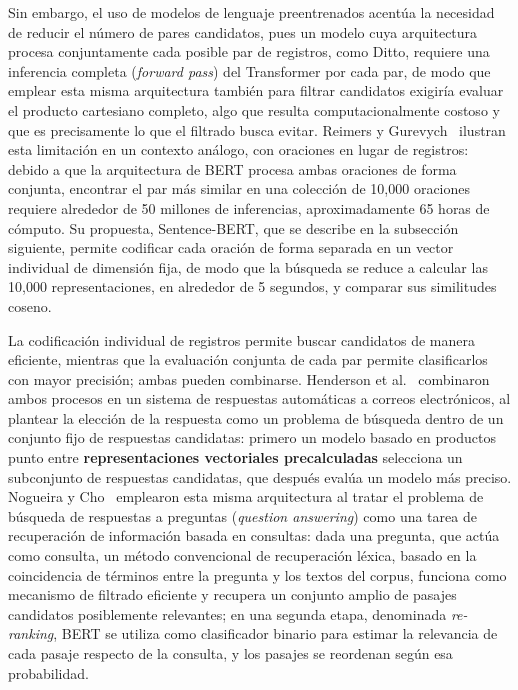 Sin embargo, el uso de modelos de lenguaje preentrenados acentúa la necesidad de reducir el número de pares candidatos, pues un modelo cuya arquitectura procesa conjuntamente cada posible par de registros, como Ditto, requiere una inferencia completa (\textit{forward pass}) del Transformer por cada par, de modo que emplear esta misma arquitectura también para filtrar candidatos exigiría evaluar el producto cartesiano completo, algo que resulta computacionalmente costoso y que es precisamente lo que el filtrado busca evitar. Reimers y Gurevych~\cite{reimers2019} ilustran esta limitación en un contexto análogo, con oraciones en lugar de registros: debido a que la arquitectura de BERT procesa ambas oraciones de forma conjunta, encontrar el par más similar en una colección de 10,000 oraciones requiere alrededor de 50 millones de inferencias, aproximadamente 65 horas de cómputo. Su propuesta, Sentence-BERT, que se describe en la subsección siguiente, permite codificar cada oración de forma separada en un vector individual de dimensión fija, de modo que la búsqueda se reduce a calcular las 10,000 representaciones, en alrededor de 5 segundos, y comparar sus similitudes coseno.

La codificación individual de registros permite buscar candidatos de manera eficiente, mientras que la evaluación conjunta de cada par permite clasificarlos con mayor precisión; ambas pueden combinarse. Henderson et al.~\cite{henderson2017} combinaron ambos procesos en un sistema de respuestas automáticas a correos electrónicos, al plantear la elección de la respuesta como un problema de búsqueda dentro de un conjunto fijo de respuestas candidatas: primero un modelo basado en productos punto entre \textbf{representaciones vectoriales precalculadas} selecciona un subconjunto de respuestas candidatas, que después evalúa un modelo más preciso. Nogueira y Cho~\cite{nogueira2019} emplearon esta misma arquitectura al tratar el problema de búsqueda de respuestas a preguntas (\textit{question answering}) como una tarea de recuperación de información basada en consultas: dada una pregunta, que actúa como consulta, un método convencional de recuperación léxica, basado en la coincidencia de términos entre la pregunta y los textos del corpus, funciona como mecanismo de filtrado eficiente y recupera un conjunto amplio de pasajes candidatos posiblemente relevantes; en una segunda etapa, denominada \textit{re-ranking}, BERT se utiliza como clasificador binario para estimar la relevancia de cada pasaje respecto de la consulta, y los pasajes se reordenan según esa probabilidad.

